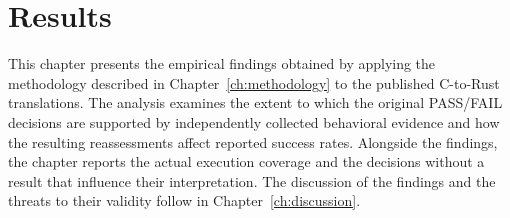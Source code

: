 \newcommand{\fmtn}[1]{\expandafter\num\expandafter{\romannumeral-`0\csname #1\endcsname}}
\newcommand{\frc}[1]{\fmtn{#1Num}/\fmtn{#1Den}}
\newcommand{\frp}[1]{\fmtn{#1Num}/\fmtn{#1Den} (\csname #1Pct\endcsname\%)}
\newcommand{\frz}[1]{\ifnum\csname #1Den\endcsname=0 n/a\else\frc{#1}\fi}
\newcommand{\srrow}[2]{\csname rqSR#1All#2Pct\endcsname{} $\rightarrow$ \csname rqSRLo#1All#2Pct\endcsname--\srup{#1}{#2}}
\newcommand{\srup}[2]{\csname rqSRUp#1All#2Pct\endcsname}
\newcommand{\openE}{\rqOpenExeAllNum}
\newcommand{\widthE}{\rqSRWidthTightExeAllPct}
\newcommand{\lossE}{\rqLossTotalExeAllNum}
\newcommand{\lossL}{\rqLossTotalLibAllNum}
\chapter{Results}\label{ch:results}

This chapter presents the empirical findings obtained by applying the methodology described in Chapter~\ref{ch:methodology} to the published C-to-Rust translations. The analysis examines the extent to which the original PASS/FAIL decisions are supported by independently collected behavioral evidence and how the resulting reassessments affect reported success rates. Alongside the findings, the chapter reports the actual execution coverage and the decisions without a result that influence their interpretation. The discussion of the findings and the threats to their validity follow in Chapter~\ref{ch:discussion}.

